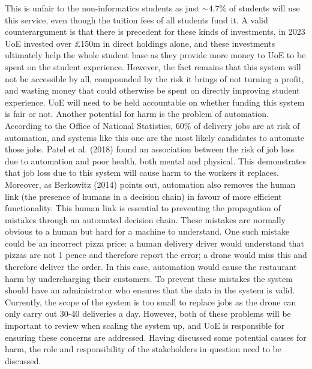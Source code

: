 \documentclass{article}
\begin{document}
This is unfair to the non-informatics students as just $\sim4.7\%$ of students will use this service, even though the tuition fees of all students fund it. 
A valid counterargument is that there is precedent for these kinds of investments, in 2023 UoE invested over £150m in direct holdings alone\supercite{edinburgh-investments}, and these investments ultimately help the whole student base as they provide more money to UoE to be spent on the student experience. 
However, the fact remains that this system will not be accessible by all, compounded by the risk it brings of not turning a profit, and wasting money that could otherwise be spent on directly improving student experience. 
UoE will need to be held accountable on whether funding this system is fair or not.
\newline 
\newline
Another potential for harm is the problem of automation.
According to the Office of National Statistics, $60\%$ of delivery jobs are at risk of automation\supercite{ONS-automation}, and systems like this one are the most likely candidates to automate those jobs. 
Patel et al. (2018) found an association between the risk of job loss due to automation and poor health, both mental and physical.\supercite{PATEL201854}
This demonstrates that job loss due to this system will cause harm to the workers it replaces.
Moreover, as Berkowitz (2014) points out, automation also removes the human link (the presence of humans in a decision chain) in favour of more efficient functionality\supercite{berkowitz_2014}. 
This human link is essential to preventing the propagation of mistakes through an automated decision chain\supercite{berkowitz_2014}. 
These mistakes are normally obvious to a human but hard for a machine to understand. 
One such mistake could be an incorrect pizza price: a human delivery driver would understand that pizzas are not 1 pence and therefore report the error; a drone would miss this and therefore deliver the order. 
In this case, automation would cause the restaurant harm by undercharging their customers. 
To prevent these mistakes the system should have an administrator who ensures that the data in the system is valid. 
Currently, the scope of the system is too small to replace jobs as the drone can only carry out 30-40 deliveries a day. 
However, both of these problems will be important to review when scaling the system up, and UoE is responsible for ensuring these concerns are addressed. 
\newline
\newline
Having discussed some potential causes for harm, the role and responsibility of the stakeholders in question need to be discussed. 
\end{document}
